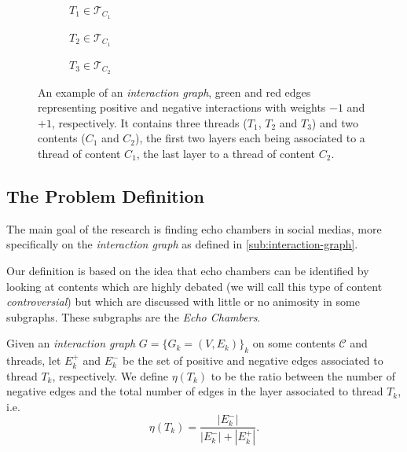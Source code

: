 \begin{figure}
	\begin{center}
		\begin{subfigure}[b]{0.3\textwidth}
			\centering
			\caption{$T_{1} \in \mathcal{T}_{C_{1}} $}
			\label{fig:tex/tikz/graph_thread1.tikz}
		\end{subfigure}
		\begin{subfigure}[b]{0.3\textwidth}
			\centering
			\caption{$T_{2} \in \mathcal{T}_{C_{1}} $}
			\label{fig:tex/tikz/graph_thread2.tikz}
		\end{subfigure}
		\begin{subfigure}[b]{0.3\textwidth}
			\centering
			\caption{$T_{3} \in \mathcal{T}_{C_{2}} $}
			\label{fig:tex/tikz/graph_thread3.tikz}
		\end{subfigure}
	\end{center}
	\caption[Example of an \emph{interaction graph}]{An example of an \emph{interaction graph}, green and red edges
		representing positive and negative interactions with weights $-1$ and
		$+1$, respectively. It
		contains three threads ($T_1$, $T_2$ and $T_3$) and two contents ($C_1$
		and $C_2$), the first two layers each being
		associated to a thread of content $C_{1} $, the last layer to a thread
		of content $C_{2} $.}
	\label{fig:interaction-graph-example}
\end{figure}

\subsection{The Problem Definition}%
\label{sub:the_problem_definition}

The main goal of the research is finding echo chambers in social medias, more
specifically on the \emph{interaction graph} as defined in
\autoref{sub:interaction-graph}.

Our definition is based on the idea that echo chambers can be identified by
looking at contents which are highly debated (we will call
this type of content \emph{controversial}) but which are discussed with little
or no animosity in some subgraphs. These subgraphs are the \emph{Echo
	Chambers}.

\bigskip

Given an \emph{interaction graph} $G = \{G_k = (V,E_k) \}_k$ on some contents
$\mathcal{C} $ and threads, let $E^{+}_k$ and $E^{-}_k$ be the set of
positive and negative edges associated to thread $T_k$, respectively. We define
$\eta(T_k)$ to be the ratio between the number of
negative edges and the total number of edges in the layer associated to thread
$T_k$, i.e.
\begin{equation*}
	\eta(T_k) = \frac{|E^{-}_{k}|}{|E^{-}_{k}| + |E^{+}_{k}|}.
\end{equation*}

